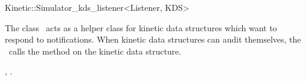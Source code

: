

\begin{ccRefClass}{Kinetic::Simulator_kds_listener<Listener, KDS>}  %


\ccDefinition
  
The class \ccRefName\ acts as a helper class for kinetic data
structures which want to respond to
 notifications. When kinetic
data structures can audit themselves, the \ccRefName\ calls the
 method on the kinetic data structure.



\ccCreation
{}  %


\ccSeeAlso

, .



\end{ccRefClass}


